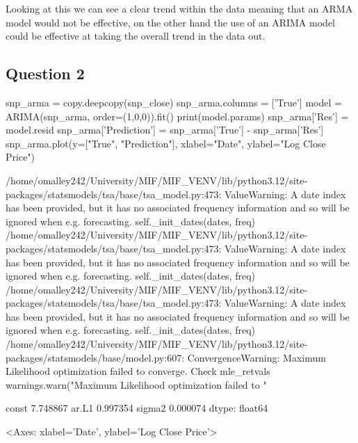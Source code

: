 Looking at this we can see a clear trend within the data meaning that an
ARMA model would not be effective, on the other hand the use of an ARIMA
model could be effective at taking the overall trend in the data out.

\hypertarget{question-2}{%
\subsection{Question 2}\label{question-2}}

\begin{python}[language=Python]
snp_arma = copy.deepcopy(snp_close)
snp_arma.columns = ['True']
model = ARIMA(snp_arma, order=(1,0,0)).fit()
print(model.params)
snp_arma['Res'] = model.resid
snp_arma['Prediction'] = snp_arma['True'] - snp_arma['Res']
snp_arma.plot(y=["True", "Prediction"], xlabel="Date", ylabel="Log Close Price")
\end{python}

\begin{python}
/home/omalley242/University/MIF/MIF_VENV/lib/python3.12/site-packages/statsmodels/tsa/base/tsa_model.py:473: ValueWarning: A date index has been provided, but it has no associated frequency information and so will be ignored when e.g. forecasting.
  self._init_dates(dates, freq)
/home/omalley242/University/MIF/MIF_VENV/lib/python3.12/site-packages/statsmodels/tsa/base/tsa_model.py:473: ValueWarning: A date index has been provided, but it has no associated frequency information and so will be ignored when e.g. forecasting.
  self._init_dates(dates, freq)
/home/omalley242/University/MIF/MIF_VENV/lib/python3.12/site-packages/statsmodels/tsa/base/tsa_model.py:473: ValueWarning: A date index has been provided, but it has no associated frequency information and so will be ignored when e.g. forecasting.
  self._init_dates(dates, freq)
/home/omalley242/University/MIF/MIF_VENV/lib/python3.12/site-packages/statsmodels/base/model.py:607: ConvergenceWarning: Maximum Likelihood optimization failed to converge. Check mle_retvals
  warnings.warn("Maximum Likelihood optimization failed to "


const     7.748867
ar.L1     0.997354
sigma2    0.000074
dtype: float64





<Axes: xlabel='Date', ylabel='Log Close Price'>
\end{python}

